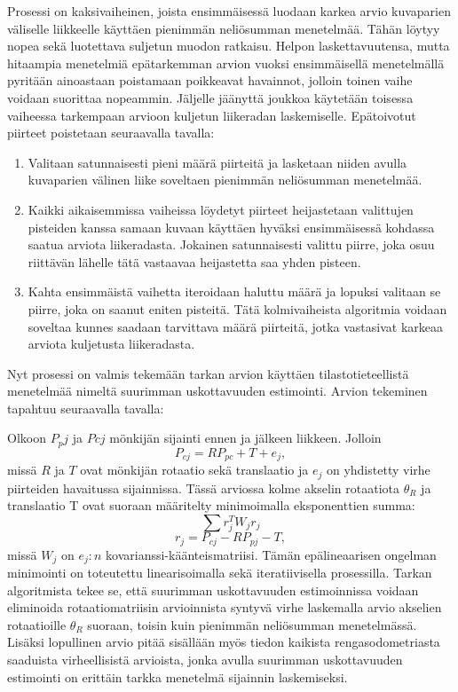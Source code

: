 \documentclass[finnish]{tktltiki2}
\theoremstyle{definition}
\theoremstyle{remark}
\begin{document}
Prosessi on kaksivaiheinen, joista ensimmäisessä luodaan karkea arvio kuvaparien väliselle liikkeelle käyttäen pienimmän neliösumman menetelmää. Tähän löytyy nopea sekä luotettava suljetun muodon ratkaisu. Helpon laskettavuutensa, mutta hitaampia menetelmiä epätarkemman arvion vuoksi ensimmäisellä menetelmällä pyritään ainoastaan poistamaan poikkeavat havainnot, jolloin toinen vaihe voidaan suorittaa nopeammin. Jäljelle jäänyttä joukkoa käytetään toisessa vaiheessa tarkempaan arvioon kuljetun liikeradan laskemiselle. Epätoivotut piirteet poistetaan seuraavalla tavalla:

\begin{enumerate}
\item Valitaan satunnaisesti pieni määrä piirteitä ja lasketaan niiden avulla kuvaparien välinen liike soveltaen pienimmän neliösumman menetelmää.

\item Kaikki aikaisemmissa vaiheissa löydetyt piirteet heijastetaan valittujen pisteiden kanssa samaan kuvaan käyttäen hyväksi ensimmäisessä kohdassa saatua arviota liikeradasta. Jokainen satunnaisesti valittu piirre, joka osuu riittävän lähelle tätä vastaavaa heijastetta saa yhden pisteen.

\item Kahta ensimmäistä vaihetta iteroidaan haluttu määrä ja lopuksi valitaan se piirre, joka on saanut eniten pisteitä. Tätä kolmivaiheista algoritmia voidaan soveltaa kunnes saadaan tarvittava määrä piirteitä, jotka vastasivat karkeaa arviota kuljetusta liikeradasta.
\end{enumerate}

Nyt prosessi on valmis tekemään tarkan arvion käyttäen tilastotieteellistä menetelmää nimeltä suurimman uskottavuuden estimointi. Arvion tekeminen tapahtuu seuraavalla tavalla:

Olkoon $P_pj$ ja $Pcj$ mönkijän sijainti ennen ja jälkeen liikkeen. Jolloin
\[P_{cj} = RP_{pc} + T + e_j,\]
missä $R$ ja $T$ ovat mönkijän rotaatio sekä translaatio ja $e_j$ on yhdistetty virhe piirteiden havaitussa sijainnissa. Tässä arviossa kolme akselin rotaatiota $\theta_R$ ja translaatio T ovat suoraan määritelty minimoimalla eksponenttien summa:
\[\sum r^T_jW_jr_j\]
\[r_j = P_{cj}-RP_{pj}-T,\]
missä $W_j$ on $e_j:n$ kovarianssi-käänteismatriisi. Tämän epälineaarisen ongelman minimointi on toteutettu linearisoimalla sekä iteratiivisella prosessilla. Tarkan algoritmista tekee se, että suurimman uskottavuuden estimoinnissa voidaan eliminoida rotaatiomatriisin arvioinnista syntyvä virhe laskemalla arvio akselien rotaatioille $\theta_R$ suoraan, toisin kuin pienimmän neliösumman menetelmässä. Lisäksi lopullinen arvio pitää sisällään myös tiedon kaikista rengasodometriasta saaduista virheellisistä arvioista, jonka avulla suurimman uskottavuuden estimointi on erittäin tarkka menetelmä sijainnin laskemiseksi.
\end{document}
